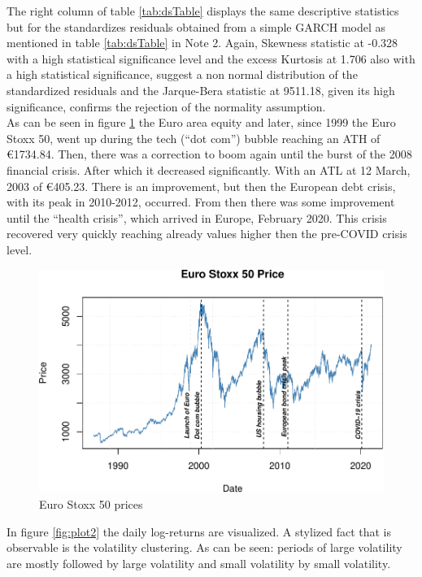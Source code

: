 \documentclass[a4paper, nobind]{templates/ociamthesis}
\begin{document}
\noindent The right column of table \ref{tab:dsTable} displays the same descriptive statistics but for the standardizes residuals obtained from a simple GARCH model as mentioned in table \ref{tab:dsTable} in Note 2. Again, Skewness statistic at -0.328 with a high statistical significance level and the excess Kurtosis at 1.706 also with a high statistical significance, suggest a non normal distribution of the standardized residuals and the Jarque-Bera statistic at 9511.18, given its high significance, confirms the rejection of the normality assumption.~\\

\noindent As can be seen in figure \ref{fig:plot1} the Euro area equity and later, since 1999 the Euro Stoxx 50, went up during the tech (``dot com'') bubble reaching an ATH of €1734.84. Then, there was a correction to boom again until the burst of the 2008 financial crisis. After which it decreased significantly. With an ATL at 12 March, 2003 of €405.23. There is an improvement, but then the European debt crisis, with its peak in 2010-2012, occurred. From then there was some improvement until the ``health crisis'', which arrived in Europe, February 2020. This crisis recovered very quickly reaching already values higher then the pre-COVID crisis level.

\begin{figure}[h]

{\centering \includegraphics[width=0.95\linewidth]{_main_files/figure-latex/plot1-1} 

}

\caption{Euro Stoxx 50 prices}\label{fig:plot1}
\end{figure}

\noindent In figure \ref{fig:plot2} the daily log-returns are visualized. A stylized fact that is observable is the volatility clustering. As can be seen: periods of large volatility are mostly followed by large volatility and small volatility by small volatility.
\end{document}
